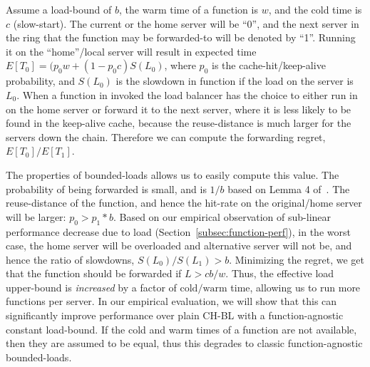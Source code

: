 

Assume a load-bound of $b$, the warm time of a function is $w$, and the cold time is $c$ (slow-start). 
%
The current or the home server will be ``0'', and the next server in the ring that the function may be forwarded-to will be denoted by ``1''. 
Running it on the ``home''/local server will result in expected time $E[T_0] = (p_0w+(1-p_0c)S(L_0) $, where $p_0$ is the cache-hit/keep-alive probability, and $S(L_0)$ is the slowdown in function if the load on the server is $L_0$. 
When a function in invoked the load balancer has the choice to either run in on the home server or forward it to the next server, where it is less likely to be found in the keep-alive cache, because the reuse-distance is much larger for the servers down the chain.
Therefore we can compute the forwarding regret, $E[T_0]/E[T_1]$.

The properties of bounded-loads allows us to easily compute this value.
The probability of being forwarded is small, and is $1/b$ based on Lemma 4 of~\cite{mirrokni2018consistent}.
The reuse-distance of the function, and hence the hit-rate on the original/home server will be larger: $p_0 > p_1*b$. 
Based on our empirical observation of sub-linear performance decrease due to load (Section~\ref{subsec:function-perf}), in the worst case, the home server will be overloaded and alternative server will not be, and hence the ratio of slowdowns, $S(L_0)/S(L_1) > b$.
%
Minimizing the regret, we get that the function should be forwarded if $L>cb/w$.
Thus, the effective load upper-bound is \emph{increased} by a factor of $\text{cold}/\text{warm}$  time, allowing us to run more functions per server. 
In our empirical evaluation, we will show that this can significantly improve performance over plain CH-BL with a function-agnostic constant load-bound.
If the cold and warm times of a function are not available, then they are assumed to be equal, thus this degrades to classic function-agnostic bounded-loads. 




